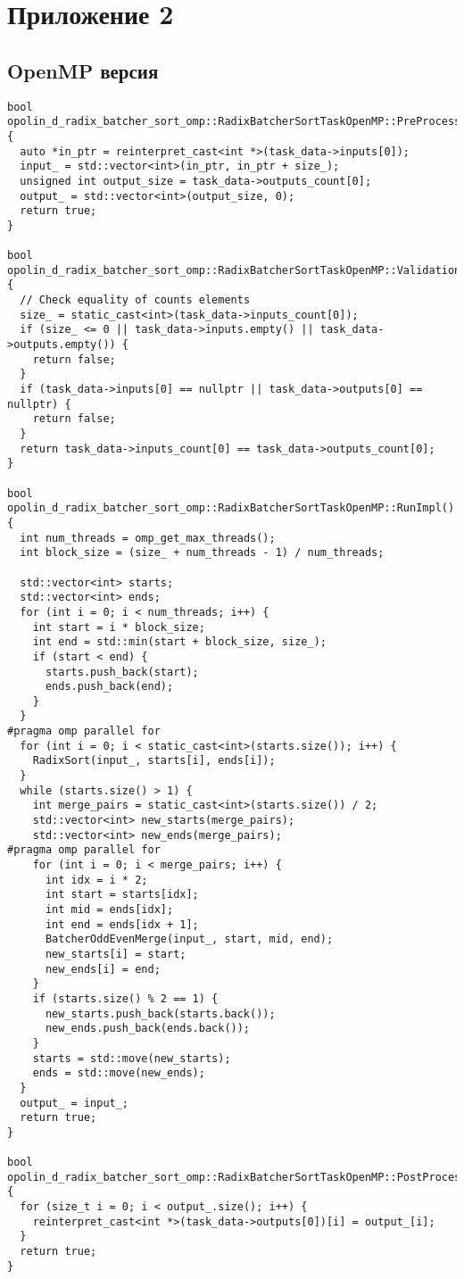 \documentclass[12pt,a4paper]{extarticle}
\newcommand{\appendixsection}[1]{%
	\clearpage
	\section*{\centering Приложение #1}
	\addcontentsline{toc}{section}{Приложение #1}
}
\begin{document}
\appendixsection{2}
\subsection*{OpenMP версия}

\begin{lstlisting}
bool opolin_d_radix_batcher_sort_omp::RadixBatcherSortTaskOpenMP::PreProcessingImpl() {
  auto *in_ptr = reinterpret_cast<int *>(task_data->inputs[0]);
  input_ = std::vector<int>(in_ptr, in_ptr + size_);
  unsigned int output_size = task_data->outputs_count[0];
  output_ = std::vector<int>(output_size, 0);
  return true;
}

bool opolin_d_radix_batcher_sort_omp::RadixBatcherSortTaskOpenMP::ValidationImpl() {
  // Check equality of counts elements
  size_ = static_cast<int>(task_data->inputs_count[0]);
  if (size_ <= 0 || task_data->inputs.empty() || task_data->outputs.empty()) {
    return false;
  }
  if (task_data->inputs[0] == nullptr || task_data->outputs[0] == nullptr) {
    return false;
  }
  return task_data->inputs_count[0] == task_data->outputs_count[0];
}

bool opolin_d_radix_batcher_sort_omp::RadixBatcherSortTaskOpenMP::RunImpl() {
  int num_threads = omp_get_max_threads();
  int block_size = (size_ + num_threads - 1) / num_threads;

  std::vector<int> starts;
  std::vector<int> ends;
  for (int i = 0; i < num_threads; i++) {
    int start = i * block_size;
    int end = std::min(start + block_size, size_);
    if (start < end) {
      starts.push_back(start);
      ends.push_back(end);
    }
  }
#pragma omp parallel for
  for (int i = 0; i < static_cast<int>(starts.size()); i++) {
    RadixSort(input_, starts[i], ends[i]);
  }
  while (starts.size() > 1) {
    int merge_pairs = static_cast<int>(starts.size()) / 2;
    std::vector<int> new_starts(merge_pairs);
    std::vector<int> new_ends(merge_pairs);
#pragma omp parallel for
    for (int i = 0; i < merge_pairs; i++) {
      int idx = i * 2;
      int start = starts[idx];
      int mid = ends[idx];
      int end = ends[idx + 1];
      BatcherOddEvenMerge(input_, start, mid, end);
      new_starts[i] = start;
      new_ends[i] = end;
    }
    if (starts.size() % 2 == 1) {
      new_starts.push_back(starts.back());
      new_ends.push_back(ends.back());
    }
    starts = std::move(new_starts);
    ends = std::move(new_ends);
  }
  output_ = input_;
  return true;
}

bool opolin_d_radix_batcher_sort_omp::RadixBatcherSortTaskOpenMP::PostProcessingImpl() {
  for (size_t i = 0; i < output_.size(); i++) {
    reinterpret_cast<int *>(task_data->outputs[0])[i] = output_[i];
  }
  return true;
}


\end{lstlisting}
\end{document}
